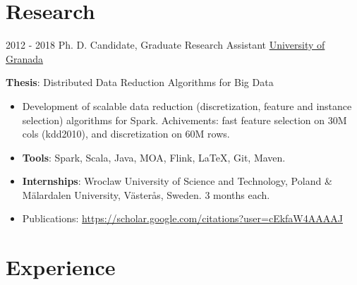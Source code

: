 \documentclass[letterpaper]{twentysecondcv} %
\begin{document}
\section{Research}
\begin{twenty}
	\twentyitem
    	{2012 - 2018}
		{}
        {Ph. D. Candidate, Graduate Research Assistant}
        {\href{http://www.ugr.es/}{University of Granada}}
        {}
        {
       	\textbf{Thesis}: Distributed Data Reduction Algorithms for Big Data
        {\begin{itemize}
        \item Development of scalable data reduction (discretization, feature and instance selection) algorithms for Spark. Achivements: fast feature selection on 30M cols (kdd2010), and discretization on 60M rows.
        \item \textbf{Tools}: Spark, Scala, Java, MOA, Flink, \LaTeX, Git, Maven.
        \item \textbf{Internships}: Wroclaw University of Science and Technology, Poland \& M\"alardalen University, V\"aster\aa s, Sweden. 3 months each.        
        \item Publications: \url{https://scholar.google.com/citations?user=cEkfaW4AAAAJ}
		\end{itemize}}
        }
\end{twenty}


\section{Experience}
\end{document}
